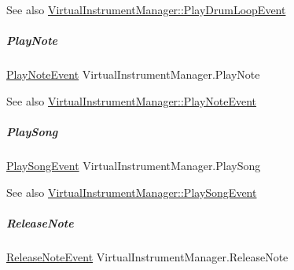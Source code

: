 \begin{DoxySeeAlso}{See also}
\hyperlink{group___virtual_instrument_manager_class_virtual_instrument_manager_1_1_play_drum_loop_event}{Virtual\+Instrument\+Manager\+::\+Play\+Drum\+Loop\+Event} 
\end{DoxySeeAlso}
\mbox{\label{group___virtual_instrument_manager_aa21021c13a8c9d13cbf374d5bf9d68fa}} 
\subparagraph{\texorpdfstring{Play\+Note}{PlayNote}}
{\footnotesize\ttfamily \hyperlink{group___virtual_instrument_manager_class_virtual_instrument_manager_1_1_play_note_event}{Play\+Note\+Event} Virtual\+Instrument\+Manager.\+Play\+Note}

\begin{DoxySeeAlso}{See also}
\hyperlink{group___virtual_instrument_manager_class_virtual_instrument_manager_1_1_play_note_event}{Virtual\+Instrument\+Manager\+::\+Play\+Note\+Event} 
\end{DoxySeeAlso}
\mbox{\label{group___virtual_instrument_manager_ae450bdba9c513ab4e43f69def50fa84d}} 
\subparagraph{\texorpdfstring{Play\+Song}{PlaySong}}
{\footnotesize\ttfamily \hyperlink{group___virtual_instrument_manager_class_virtual_instrument_manager_1_1_play_song_event}{Play\+Song\+Event} Virtual\+Instrument\+Manager.\+Play\+Song}

\begin{DoxySeeAlso}{See also}
\hyperlink{group___virtual_instrument_manager_class_virtual_instrument_manager_1_1_play_song_event}{Virtual\+Instrument\+Manager\+::\+Play\+Song\+Event} 
\end{DoxySeeAlso}
\mbox{\label{group___virtual_instrument_manager_a3a1726a6366126421434c2c7be5e5678}} 
\subparagraph{\texorpdfstring{Release\+Note}{ReleaseNote}}
{\footnotesize\ttfamily \hyperlink{group___virtual_instrument_manager_class_virtual_instrument_manager_1_1_release_note_event}{Release\+Note\+Event} Virtual\+Instrument\+Manager.\+Release\+Note}

